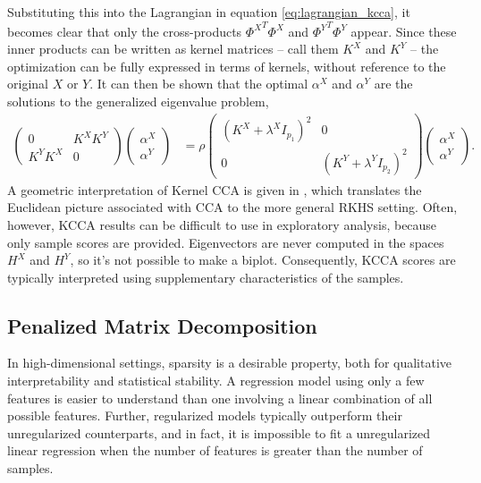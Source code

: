 \documentclass[14pt]{extarticle}
\begin{document}
Substituting this into the Lagrangian in equation \ref{eq:lagrangian_kcca}, it
becomes clear that only the cross-products ${\Phi^X}^{T}\Phi^{X}$ and
${\Phi^{Y}}^{T} \Phi^{Y}$ appear. Since these inner products can be written as
kernel matrices -- call them $K^{X}$ and $K^{Y}$ -- the optimization can be
fully expressed in terms of kernels, without reference to the original $X$ or
$Y$. It can then be shown that the optimal $\alpha^{X}$ and $\alpha^{Y}$ are the
solutions to the generalized eigenvalue problem,
\begin{align*}
  \begin{pmatrix}
    0 & K^{X}K^{Y} \\
    K^{Y}K^{X} & 0
  \end{pmatrix}
  \begin{pmatrix}
    \alpha^{X} \\
    \alpha^{Y}
  \end{pmatrix}
&= \rho
\begin{pmatrix}
  \left(K^{X} + \lambda^{X}I_{p_{1}}\right)^{2} & 0 \\
  0 & \left(K^{Y} + \lambda^{Y}I_{p_{2}}\right)^{2}
\end{pmatrix}
\begin{pmatrix}
  \alpha^{X} \\
  \alpha^{Y}
\end{pmatrix}.
\end{align*}
A geometric interpretation of Kernel CCA is given in \cite{kuss2003geometry},
which translates the Euclidean picture associated with CCA to the more general
RKHS setting. Often, however, KCCA results can be difficult to use in
exploratory analysis, because only sample scores are provided. Eigenvectors are
never computed in the spaces $H^{X}$ and $H^{Y}$, so it's not possible to make a
biplot. Consequently, KCCA scores are typically interpreted using supplementary
characteristics of the samples.

\subsection{Penalized Matrix Decomposition}
\label{subsec:pmd}

In high-dimensional settings, sparsity is a desirable property, both for
qualitative interpretability and statistical stability. A regression model using
only a few features is easier to understand than one involving a linear
combination of all possible features. Further, regularized models typically
outperform their unregularized counterparts, and in fact, it is impossible to
fit a unregularized linear regression when the number of features is greater
than the number of samples.
\end{document}
